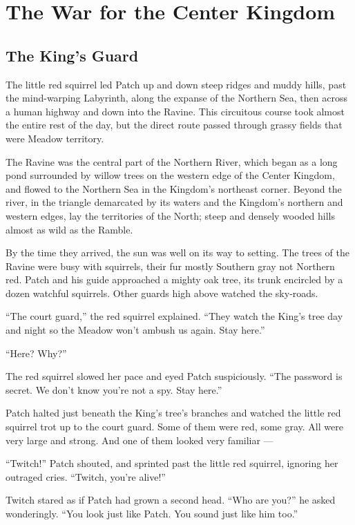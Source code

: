 \documentclass[12pt]{memoir}
\begin{document}

\chapter{The War for the Center Kingdom}

\section{The King’s Guard}

The little red squirrel led Patch up and down steep ridges and muddy
hills, past the mind-warping Labyrinth, along the expanse of the
Northern Sea, then across a human highway and down into the
Ravine. This circuitous course took almost the entire rest of the day,
but the direct route passed through grassy fields that were Meadow
territory.

The Ravine was the central part of the Northern River, which began as
a long pond surrounded by willow trees on the western edge of the
Center Kingdom, and flowed to the Northern Sea in the Kingdom’s
northeast corner. Beyond the river, in the triangle demarcated by its
waters and the Kingdom’s northern and western edges, lay the
territories of the North; steep and densely wooded hills almost as
wild as the Ramble.

By the time they arrived, the sun was well on its way to setting. The
trees of the Ravine were busy with squirrels, their fur mostly
Southern gray not Northern red. Patch and his guide approached a
mighty oak tree, its trunk encircled by a dozen watchful
squirrels. Other guards high above watched the sky-roads.

“The court guard,” the red squirrel explained. “They watch the King’s
tree day and night so the Meadow won’t ambush us again. Stay here.”

“Here? Why?”

The red squirrel slowed her pace and eyed Patch suspiciously. “The
password is secret. We don’t know you’re not a spy. Stay here.”

Patch halted just beneath the King’s tree’s branches and watched the
little red squirrel trot up to the court guard. Some of them were red,
some gray. All were very large and strong. And one of them looked very
familiar —

“Twitch!” Patch shouted, and sprinted past the little red squirrel,
ignoring her outraged cries. “Twitch, you’re alive!”

Twitch stared as if Patch had grown a second head. “Who are you?” he
asked wonderingly. “You look just like Patch. You sound just like him
too.”
\end{document}
